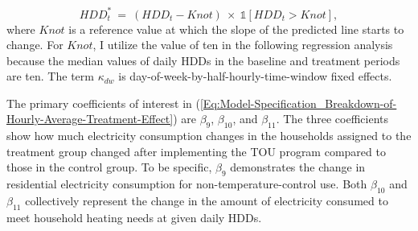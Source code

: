 \begin{equation}
HDD_{t}^{*} \ = \ (HDD_{t} - Knot) \ \times \ \mathbb{1}[HDD_{t} > Knot],
\end{equation}
where $Knot$ is a reference value at which the slope of the predicted line starts to change. For $Knot$, I utilize the value of ten in the following regression analysis because the median values of daily HDDs in the baseline and treatment periods are ten. The term $\kappa_{dw}$ is day-of-week-by-half-hourly-time-window fixed effects. 

The primary coefficients of interest in (\ref{Eq:Model-Specification_Breakdown-of-Hourly-Average-Treatment-Effect}) are $\beta_{9}$, $\beta_{10}$, and $\beta_{11}$. The three coefficients show how much electricity consumption changes in the households assigned to the treatment group changed after implementing the TOU program compared to those in the control group. To be specific, $\beta_{9}$ demonstrates the change in residential electricity consumption for non-temperature-control use. Both $\beta_{10}$ and $\beta_{11}$ collectively represent the change in the amount of electricity consumed to meet household heating needs at given daily HDDs. 

